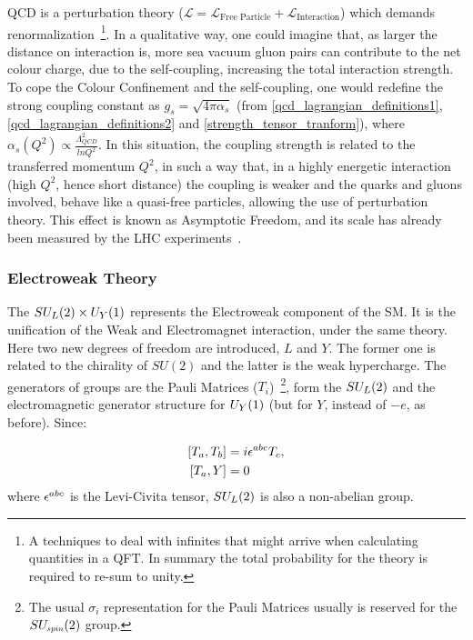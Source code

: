 QCD is a perturbation theory ($\mathcal{L} = \mathcal{L}_{\text{Free Particle}} + \mathcal{L}_{\text{Interaction}}$) which demands renormalization~\footnote{A techniques to deal with infinites that might arrive when calculating quantities in a QFT. In summary the total probability for the theory is required to re-sum to unity.}. In a qualitative way, one could imagine that, as larger the distance on interaction is, more sea vacuum gluon pairs can contribute to the net colour charge, due to the self-coupling, increasing the total interaction strength. To cope the Colour Confinement and the self-coupling, one would redefine the strong coupling constant as $g_s = \sqrt{4 \pi \alpha_s}$ (from \ref{qcd_lagrangian_definitions1}, \ref{qcd_lagrangian_definitions2} and \ref{strength_tensor_tranform}), where $\alpha_s(Q^2) \propto \frac{\Lambda^2_{QCD}}{ln Q^2}$. In this situation, the coupling strength is related to the transferred momentum $Q^2$, in such a way that, in a highly energetic interaction (high $Q^2$, hence short distance) the coupling is weaker and the quarks and gluons involved, behave like a quasi-free particles, allowing the use of perturbation theory. This effect is known as Asymptotic Freedom, and its scale has already been measured by the LHC experiments~\cite{pdg_2020}.

\subsubsection{Electroweak Theory}

The $SU_{\scaleto{L}{5pt}}(2) \times U_{\scaleto{Y}{5pt}}(1)$ represents the Electroweak component of the SM. It is the unification of the Weak and Electromagnet interaction, under the same theory. Here two new degrees of freedom are introduced, $L$ and $Y$. The former one is related to the chirality of $SU(2)$ and the latter is the weak hypercharge. The generators of groups are the Pauli Matrices ($T_i$)~\footnote{The usual $\sigma_i$ representation for the Pauli Matrices usually is reserved for the $SU_{\scaleto{spin}{5pt}}(2)$ group.}, form the $SU_{\scaleto{L}{5pt}}(2)$ and the electromagnetic generator structure for $U_{\scaleto{Y}{5pt}}(1)$ (but for $Y$, instead of $-e$, as before). Since:

\begin{equation}
    \begin{split}
        \left[ T_a, T_b \right] &=  i \levicivita{^{abc}}T_c,  \\
        \left[ T_a, Y \right] &=  0
    \end{split}
\label{pauli_commutator}
\end{equation}
where $\levicivita{^{abc}}$ is the Levi-Civita tensor, $SU_{\scaleto{L}{5pt}}(2)$ is also a non-abelian group.


